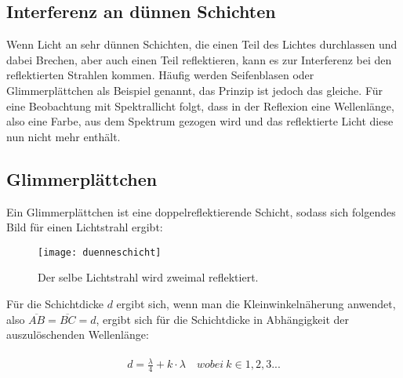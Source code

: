 \subsection{Interferenz an dünnen Schichten}

Wenn Licht an sehr dünnen Schichten, die einen Teil des Lichtes durchlassen und dabei Brechen, aber auch einen Teil reflektieren, kann es zur Interferenz bei den reflektierten Strahlen kommen. Häufig werden Seifenblasen oder Glimmerplättchen als Beispiel genannt, das Prinzip ist jedoch das gleiche. Für eine Beobachtung mit Spektrallicht folgt, dass in der Reflexion eine Wellenlänge, also eine Farbe, \glqq aus dem Spektrum gezogen wird\grqq{} und das reflektierte Licht diese nun nicht mehr enthält.


\subsection{Glimmerplättchen}

Ein Glimmerplättchen ist eine doppelreflektierende Schicht, sodass sich folgendes Bild für einen Lichtstrahl ergibt:

\begin{figure}[h!]
	\centering
	\texttt{[image: duenneschicht]}
	\caption{Der selbe Lichtstrahl wird zweimal reflektiert.}
\end{figure}

\begin{comment}
Bei beiden Reflexionen ereignet sich ein Phasensprung von $\pi$ (Siehe: \referenz{subsec:Reflexion}), sodass sich für die Schichtdicke, in Abhängigkeit der auszulöschenden Wellenlänge, folgendes ergibt:
\end{comment}

Für die Schichtdicke $d$ ergibt sich, wenn man die Kleinwinkelnäherung anwendet, also $\overline{AB} =  \overline{BC} = d$, ergibt sich für die Schichtdicke in Abhängigkeit der auszulöschenden Wellenlänge:

\begin{align}
\begin{split}
	d = \frac{\lambda}{4} + k \cdot \lambda \quad wobei \ k \in 1,2,3 ...
\end{split}
\end{align}













